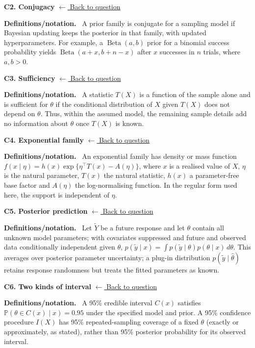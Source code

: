 \documentclass[11pt,a4paper]{article}
\newenvironment{conceptanswer}[2]
  {\par\addvspace{10pt}\noindent\begin{minipage}{\linewidth}%
   \hypertarget{concept-answer:#1}{}%
   \textcolor{statblue}{\textbf{C#1. #2}}\hfill%
   {\footnotesize\hyperlink{concept-question:#1}{$\leftarrow$ Back to question}}%
   \par\smallskip\textbf{Definitions/notation.}\ }
  {\end{minipage}\par}
\begin{document}
\begin{conceptanswer}{2}{Conjugacy}
A prior family is conjugate for a sampling model if Bayesian updating keeps
the posterior in that family, with updated hyperparameters.
For example, a $\operatorname{Beta}(a,b)$ prior for a binomial success
probability yields $\operatorname{Beta}(a+x,b+n-x)$ after $x$ successes
in $n$ trials, where $a,b>0$.
\end{conceptanswer}

\begin{conceptanswer}{3}{Sufficiency}
A statistic $T(X)$ is a function of the sample alone and is sufficient for
$\theta$ if the conditional distribution of $X$ given $T(X)$ does not
depend on $\theta$.
Thus, within the assumed model, the remaining sample details add no
information about $\theta$ once $T(X)$ is known.
\end{conceptanswer}

\begin{conceptanswer}{4}{Exponential family}
An exponential family has density or mass function
$f(x\mid\eta)=h(x)\exp\{\eta^\top T(x)-A(\eta)\}$,
where $x$ is a realised value of $X$, $\eta$ is the natural parameter,
$T(x)$ the natural statistic, $h(x)$ a parameter-free base factor and
$A(\eta)$ the log-normalising function. In the regular form used here,
the support is independent of $\eta$.

\end{conceptanswer}

\begin{conceptanswer}{5}{Posterior prediction}
Let $\tilde Y$ be a future response and let $\theta$ contain all unknown model
parameters; with covariates suppressed and future and observed data
conditionally independent given $\theta$,
$p(\tilde y\mid x)=\int p(\tilde y\mid\theta)p(\theta\mid x)\,d\theta$.
This averages over posterior parameter uncertainty; a plug-in distribution
$p(\tilde y\mid\hat\theta)$ retains response randomness but treats the fitted
parameters as known.
\end{conceptanswer}

\begin{conceptanswer}{6}{Two kinds of interval}
A 95\% credible interval $C(x)$ satisfies
$\mathbb{P}(\theta\in C(x)\mid x)=0.95$ under the specified model and prior.
A 95\% confidence procedure $I(X)$ has 95\% repeated-sampling coverage
of a fixed $\theta$ (exactly or approximately, as stated), rather than
95\% posterior probability for its observed interval.
\end{conceptanswer}
\end{document}
